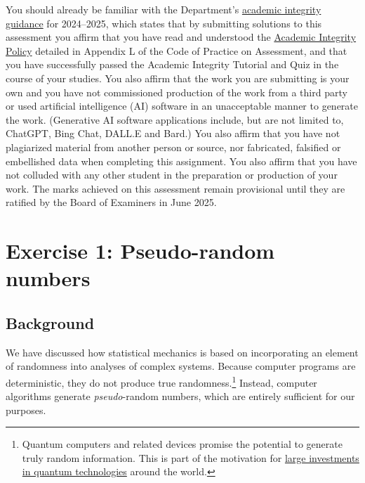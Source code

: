 \documentclass[12 pt]{article} %
\begin{document}
You should already be familiar with the Department's \href{https://canvas.liverpool.ac.uk/courses/76365/files/11992667}{academic integrity guidance} for 2024--2025, which states that by submitting solutions to this assessment you affirm that you have read and understood the \href{https://www.liverpool.ac.uk/media/livacuk/tqsd/code-of-practice-on-assessment/appendix_L_cop_assess.pdf}{Academic Integrity Policy} detailed in Appendix L of the Code of Practice on Assessment, and that you have successfully passed the Academic Integrity Tutorial and Quiz in the course of your studies.
You also affirm that the work you are submitting is your own and you have not commissioned production of the work from a third party or used artificial intelligence (AI) software in an unacceptable manner to generate the work.
(Generative AI software applications include, but are not limited to, ChatGPT, Bing Chat, DALL.E and Bard.) %
You also affirm that you have not plagiarized material from another person or source, nor fabricated, falsified or embellished data when completing this assignment.
You also affirm that you have not colluded with any other student in the preparation or production of your work.
The marks achieved on this assessment remain provisional until they are ratified by the Board of Examiners in June 2025.



\vfill %
\section*{Exercise 1: Pseudo-random numbers}
\subsection*{Background}
We have discussed how statistical mechanics is based on incorporating an element of randomness into analyses of complex systems.
Because computer programs are deterministic, they do not produce true randomness.\footnote{Quantum computers and related devices promise the potential to generate truly random information.  This is part of the motivation for \href{https://uknqt.ukri.org}{large investments in quantum technologies} around the world.}
Instead, computer algorithms generate \textit{pseudo}-random numbers, which are entirely sufficient for our purposes.
\end{document}
